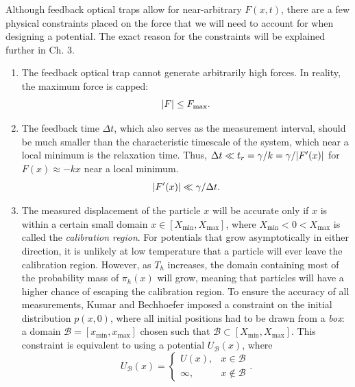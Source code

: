 \documentclass[hyperref={colorlinks=true, urlcolor=blue, citecolor=blue, final, bound}]{sfuthesis}
\begin{document}
Although feedback optical traps allow for near-arbitrary $F(x,t)$, there are a few physical constraints placed on the force that we will need to account for when designing a potential. The exact reason for the constraints will be explained further in Ch. 3. 
\begin{enumerate}
    \item The feedback optical trap cannot generate arbitrarily high forces. In reality, the maximum force is capped: 
    \begin{equation}
        \abs{F} \leq F_{\max}.\label{eq:forceConstraint}
    \end{equation} 
    \item The feedback time $\Delta t$, which also serves as the measurement interval, should be much smaller than the characteristic timescale of the system, which near a local minimum is the relaxation time. Thus, $\Delta t \ll t_r = \gamma/k = \gamma/\abs {F'(x)}$ for $F(x) \approx -kx$ near a local minimum. 
    \begin{equation}
        \abs{F'(x)} \ll \gamma/\Delta t.\label{eq:derivativeConstraint}
    \end{equation} 
    \item The measured displacement of the particle $x$ will be accurate only if $x$ is within a certain small domain $x\in [X_{\min},X_{\max}]$, where $X_{\min}<0<X_{\max}$ is called the \textit{calibration region}. For potentials that grow asymptotically in either direction, it is unlikely at low temperature that a particle will ever leave the calibration region. However, as $T_h$ increases, the domain containing most of the probability mass of $\pi_h(x)$ will grow, meaning that particles will have a higher chance of escaping the calibration region. To ensure the accuracy of all measurements, Kumar and Bechhoefer imposed a constraint on the initial distribution $p(x,0)$, where all initial positions had to be drawn from a \textit{box}: a domain $\mathcal B = [x_{\min}, x_{\max}]$ chosen such that $\mathcal B\subset [X_{\min},X_{\max}]$. This constraint is equivalent to using a potential $U_{\mathcal B}(x)$, where
    \begin{equation}
        U_{\mathcal B}(x) = \begin{cases}
            U(x),& x\in\mathcal B\\
            \infty,& x\notin\mathcal B
        \end{cases}.
    \end{equation}

\end{enumerate}
\end{document}
